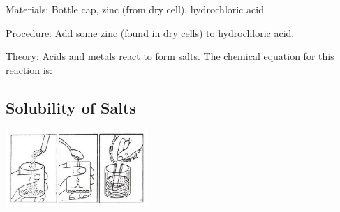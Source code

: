 \begin{multicols}{2}
\begin{description*}
\item[Materials:]{Bottle cap, zinc (from dry cell), hydrochloric acid}
\item[Procedure:]{Add some zinc (found in dry cells) to hydrochloric acid.}
\item[Theory:]{Acids and metals react to form salts. The chemical equation for this reaction is: }
\end{description*}

%
%

\subsection{Solubility of Salts}

\begin{center}
\includegraphics[width=0.4\textwidth]{./img/source/salt-solubility.jpg}
\end{center}


\end{multicols}
